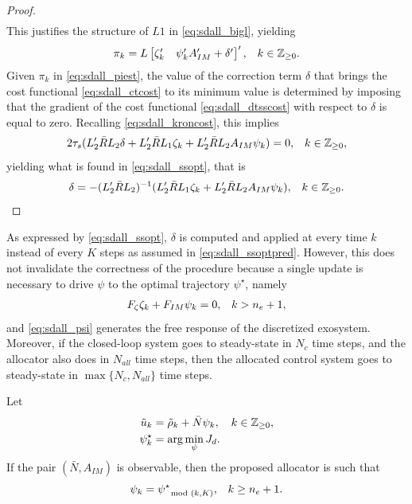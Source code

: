 \begin{proof}
\begin{align}
  \end{align}
  This justifies the structure of $L1$ in \eqref{eq:sdall_bigl}, yielding
  \begin{align}
    \label{eq:sdall_piest}
    \pi_k &= L\begin{bmatrix}\zeta_k' & \psi_k'A_{IM}'+\delta'\end{bmatrix}', & k\in\mathbb{Z}_{\geq 0}.
  \end{align}
  Given $\pi_k$ in \eqref{eq:sdall_piest}, the value of the correction term $\delta$ that brings the cost functional \eqref{eq:sdall_ctcost} to its minimum value is determined by imposing that the gradient of the cost functional \eqref{eq:sdall_dtsscost} with respect to $\delta$ is equal to zero. Recalling \eqref{eq:sdall_kroncost}, this implies
  \begin{align}
    \label{eq:sdall_nablajdelta}
    2\tau_s(L_2'\bar{R}L_2\delta + L_2'\bar{R}L_1\zeta_k + L_2'\bar{R}L_2A_{IM}\psi_k) &= 0, & k\in\mathbb{Z}_{\geq 0},
  \end{align}
  yielding what is found in \eqref{eq:sdall_ssopt}, that is
  \begin{align}
    \label{eq:sdall_delta}
    \delta &= -(L_2'\bar{R}L_2)^{-1}(L_2'\bar{R}L_1\zeta_k + L_2'\bar{R}L_2A_{IM}\psi_k), & k\in\mathbb{Z}_{\geq 0}.
  \end{align}
\end{proof}

\begin{remark}
  \label{rem:sdall_comm_delta}
  As expressed by \eqref{eq:sdall_ssopt}, $\delta$ is computed and applied at every time $k$ instead of every $K$ steps as assumed in \eqref{eq:sdall_ssoptpred}. However, this does not invalidate the correctness of the procedure because a single update is necessary to drive $\psi$ to the optimal trajectory $\psi^\star$, namely
  \begin{align}
    F_\zeta\zeta_k + F_{IM}\psi_k &= 0, & k > {n_e} + 1,
  \end{align}
  and \eqref{eq:sdall_psi} generates the free response of the discretized exosystem. Moreover, if the closed-loop system goes to steady-state in $N_c$ time steps, and the allocator also does in $N_{all}$ time steps, then the allocated control system goes to steady-state in $\max\{N_c,N_{all}\}$ time steps.\closeremark
\end{remark}

\begin{proposition}
  \label{prop:sdall_xss}
  Let
  \begin{subequations}
    \label{eq:sdall_xss}
    \begin{align}
      \tilde{u}_k &= \tilde{\rho}_k + \bar{N}\psi_k, & k\in\mathbb{Z}_{\geq 0},\\
      \psi_k^\star &= \arg\min_{\psi}J_d.
    \end{align}
  \end{subequations}
  If the pair $(\bar{N},A_{IM})$ is observable, then the proposed allocator is such that
  \begin{align}
    \psi_k &= \psi^\star_{\mod(k,K)}, & k\geq{n_e}+1.
  \end{align}
  \closestatement
\end{proposition}

